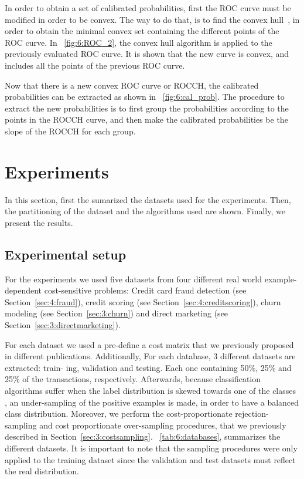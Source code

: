 In order to obtain a set of calibrated probabilities, first the ROC curve must be modified in 
order to be convex. The way to do that, is to find the convex \mbox{hull 
\citep{Hernandez-Orallo2012}}, in order to obtain the minimal convex set containing the different 
points of the ROC curve. In \figurename{~\ref{fig:6:ROC_2}}, the convex hull algorithm is applied 
to the previously evaluated ROC curve. It is shown that the new curve is convex, and includes all 
the points of the previous ROC curve.

Now that there is a new convex ROC curve or ROCCH, the calibrated probabilities can be extracted 
as shown in  \figurename{~\ref{fig:6:cal_prob}}. The procedure to extract the new probabilities is 
to first group the probabilities according to the points in the ROCCH curve, and then make the 
calibrated  probabilities be the slope of the ROCCH for each group.
  
   
\section{Experiments}
\label{sec:6:experiments}

In this section, first the sumarized the datasets used for the experiments. Then, the 
partitioning of the dataset and the algorithms used are shown. Finally, we present the results.

\subsection{Experimental setup}

For the experiments we used five datasets from four different real world example-dependent 
cost-sensitive problems: Credit card fraud detection (see Section~\ref{sec:4:fraud}), credit 
scoring (see Section~\ref{sec:4:creditscoring}), churn modeling (see Section~\ref{sec:3:churn}) and 
direct marketing (see Section~\ref{sec:3:directmarketing}).

For each dataset we used a pre-define a cost matrix that we previously proposed in different 
publications. Additionally,  For each database, 3 different datasets are extracted: train-
ing, validation and testing. Each one containing 50\%, 25\% and 25\% of the transactions, 
respectively. Afterwards, because classification algorithms suffer when the label distribution is 
skewed towards one of the classes \citep{Hastie2009}, an under-sampling of the positive examples is 
made, in order to have a balanced class distribution. Moreover, we perform the cost-proportionate 
rejection-sampling and cost proportionate over-sampling procedures, that we previously described in 
Section~\ref{sec:3:costsampling}. \tablename{~\ref{tab:6:databases}}, summarizes the 
different datasets. It is important to note that the sampling procedures were only applied to the 
training dataset since the validation and test datasets must reflect the real distribution.

